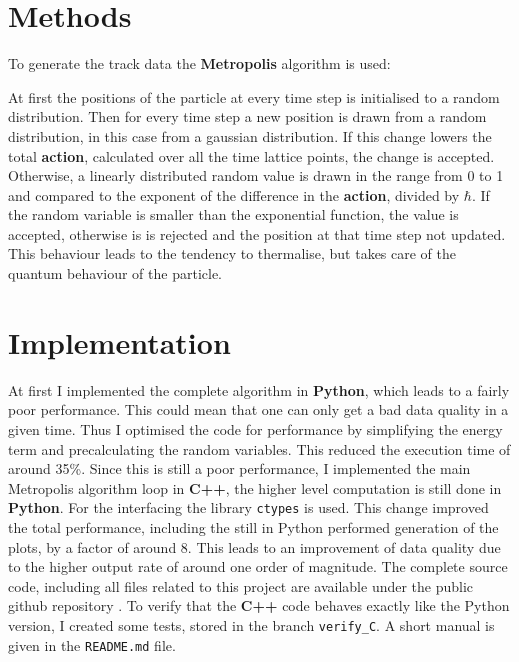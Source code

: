 \documentclass{article}
\begin{document}
	\section{Methods}
		To generate the track data the \textbf{Metropolis} algorithm is used:

		At first the positions of the particle at every time step is initialised to a random distribution.
		Then for every time step a new position is drawn from a random distribution, in this case from a gaussian distribution.
		If this change lowers the total \textbf{action}, calculated over all the time lattice points, the change is accepted.
		Otherwise, a linearly distributed random value is drawn in the range from 0 to 1 and compared to the exponent of the difference in the \textbf{action}, divided by $\hbar$.
		If the random variable is smaller than the exponential function, the value is accepted, otherwise is is rejected and the position at that time step not updated.
		This behaviour leads to the tendency to thermalise, but takes care of the quantum behaviour of the particle.
	\section{Implementation}
		At first I implemented the complete algorithm in \textbf{Python}, which leads to a fairly poor performance.
		This could mean that one can only get a bad data quality in a given time.
		Thus I optimised the code for performance by simplifying the energy term and precalculating the random variables.
		This reduced the execution time of around 35\%.
		Since this is still a poor performance, I implemented the main Metropolis algorithm loop in \textbf{C++}, the higher level computation is still done in \textbf{Python}.
		For the interfacing the library \verb!ctypes! is used.
		This change improved the total performance, including the still in Python performed generation of the plots, by a factor of around 8.
		This leads to an improvement of data quality due to the higher output rate of around one order of magnitude.
		The complete source code, including all files related to this project are available under the public github repository \cite{github}.
		To verify that the \textbf{C++} code behaves exactly like the Python version, I created some tests, stored in the branch \verb!verify_C!.
		A short manual is given in the \verb!README.md! file.
\end{document}
